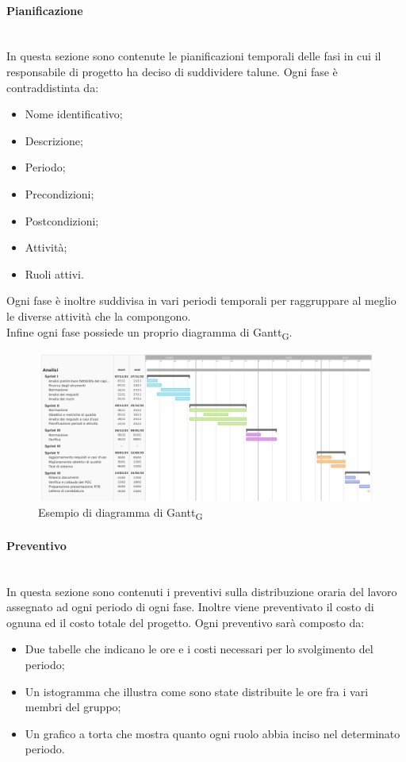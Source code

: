 \paragraph {Pianificazione}\mbox{}\\
In questa sezione sono contenute le pianificazioni temporali delle fasi in cui il responsabile di progetto ha deciso di suddividere talune.
Ogni fase è contraddistinta da:
\begin{itemize}
	\item Nome identificativo;
	\item Descrizione;
	\item Periodo;
	\item Precondizioni;
	\item Postcondizioni;
	\item Attività;
	\item Ruoli attivi.
\end{itemize}
Ogni fase è inoltre suddivisa in vari periodi temporali per raggruppare al meglio le diverse attività che la compongono.\\
Infine ogni fase possiede un proprio diagramma di Gantt\textsubscript{G}.
\begin{figure}[h!]
	\centering
	\includegraphics[width=15cm]{img/4_analisi.png}
	\caption{Esempio di diagramma di Gantt\textsubscript{G}}
\end{figure}
\paragraph {Preventivo}\mbox{}\\
In questa sezione sono contenuti i preventivi sulla distribuzione oraria del lavoro assegnato ad ogni periodo di ogni fase. Inoltre viene preventivato il costo di ognuna ed il costo totale del progetto. Ogni preventivo sarà composto da:
\begin{itemize}
	\item Due tabelle che indicano le ore e i costi necessari per lo svolgimento del periodo;
	\item Un istogramma che illustra come sono state distribuite le ore fra i vari membri del gruppo;
	\item Un grafico a torta che mostra quanto ogni ruolo abbia inciso nel determinato periodo.
\end{itemize}
